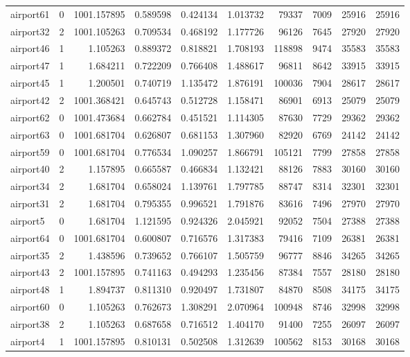 \begin{longtable}{|l|r|r|r|r|r|r|r|r|r|}
airport61 & 0 & 1001.157895 & 0.589598 & 0.424134 & 1.013732 & 79337 & 7009 & 25916 & 25916 \\
airport32 & 2 & 1001.105263 & 0.709534 & 0.468192 & 1.177726 & 96126 & 7645 & 27920 & 27920 \\
airport46 & 1 & 1.105263 & 0.889372 & 0.818821 & 1.708193 & 118898 & 9474 & 35583 & 35583 \\
airport47 & 1 & 1.684211 & 0.722209 & 0.766408 & 1.488617 & 96811 & 8642 & 33915 & 33915 \\
airport45 & 1 & 1.200501 & 0.740719 & 1.135472 & 1.876191 & 100036 & 7904 & 28617 & 28617 \\
airport42 & 2 & 1001.368421 & 0.645743 & 0.512728 & 1.158471 & 86901 & 6913 & 25079 & 25079 \\
airport62 & 0 & 1001.473684 & 0.662784 & 0.451521 & 1.114305 & 87630 & 7729 & 29362 & 29362 \\
airport63 & 0 & 1001.681704 & 0.626807 & 0.681153 & 1.307960 & 82920 & 6769 & 24142 & 24142 \\
airport59 & 0 & 1001.681704 & 0.776534 & 1.090257 & 1.866791 & 105121 & 7799 & 27858 & 27858 \\
airport40 & 2 & 1.157895 & 0.665587 & 0.466834 & 1.132421 & 88126 & 7883 & 30160 & 30160 \\
airport34 & 2 & 1.681704 & 0.658024 & 1.139761 & 1.797785 & 88747 & 8314 & 32301 & 32301 \\
airport31 & 2 & 1.681704 & 0.795355 & 0.996521 & 1.791876 & 83616 & 7496 & 27970 & 27970 \\
airport5 & 0 & 1.681704 & 1.121595 & 0.924326 & 2.045921 & 92052 & 7504 & 27388 & 27388 \\
airport64 & 0 & 1001.681704 & 0.600807 & 0.716576 & 1.317383 & 79416 & 7109 & 26381 & 26381 \\
airport35 & 2 & 1.438596 & 0.739652 & 0.766107 & 1.505759 & 96777 & 8846 & 34265 & 34265 \\
airport43 & 2 & 1001.157895 & 0.741163 & 0.494293 & 1.235456 & 87384 & 7557 & 28180 & 28180 \\
airport48 & 1 & 1.894737 & 0.811310 & 0.920497 & 1.731807 & 84870 & 8508 & 34175 & 34175 \\
airport60 & 0 & 1.105263 & 0.762673 & 1.308291 & 2.070964 & 100948 & 8746 & 32998 & 32998 \\
airport38 & 2 & 1.105263 & 0.687658 & 0.716512 & 1.404170 & 91400 & 7255 & 26097 & 26097 \\
airport4 & 1 & 1001.157895 & 0.810131 & 0.502508 & 1.312639 & 100562 & 8153 & 30168 & 30168 \\

\end{longtable}
